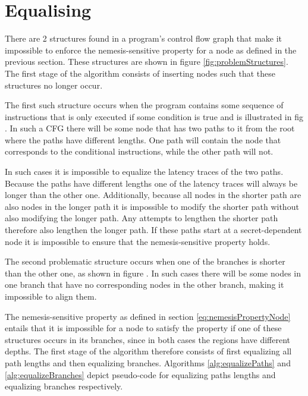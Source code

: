 \begin{figure}
 \centering

 \label{fig:regionExamples}
\end{figure}

\section{Equalising}\label{seq:equalising}
There are 2 structures found in a program's control flow graph that make it impossible to enforce the nemesis-sensitive property for a node as defined in the previous section. 
These structures are shown in figure \ref{fig:problemStructures}.  
The first stage of the algorithm consists of inserting nodes such that these structures no longer occur. 

The first such structure occurs when the program contains some sequence of instructions that is only executed if some condition is true and is illustrated in fig \label{fig:optional}.
In such a CFG there will be some node that has two paths to it from the root where the paths have different lengths. 
One path will contain the node that corresponds to the conditional instructions, while the other path will not.

In such cases it is impossible to equalize the latency traces of the two paths. Because the paths have different lengths one of the latency traces will always be 
longer than the other one. Additionally, because all nodes in the shorter path are also nodes in the longer path it is impossible to modify the shorter path without also
modifying the longer path. Any attempts to lengthen the shorter path therefore also lengthen the longer path. If these paths start at a secret-dependent node it is 
impossible to ensure that the nemesis-sensitive property holds. 

The second problematic structure occurs when one of the branches is shorter than the other one, as shown in figure \label{fig:unequal}. In such cases there will be some nodes in 
one branch that have no corresponding nodes in the other branch, making it impossible to align them. 

The nemesis-sensitive property as defined in section \ref{eq:nemesisPropertyNode} entails that it is impossible for a node to satisfy the property if one of these 
structures occurs in its branches, since in both cases the regions have different depths. 
The first stage of the algorithm therefore consists of first equalizing all path lengths and then 
equalizing branches. 
Algorithms \ref{alg:equalizePaths} and \ref{alg:equalizeBranches} depict pseudo-code for equalizing paths lengths and equalizing branches respectively. 

